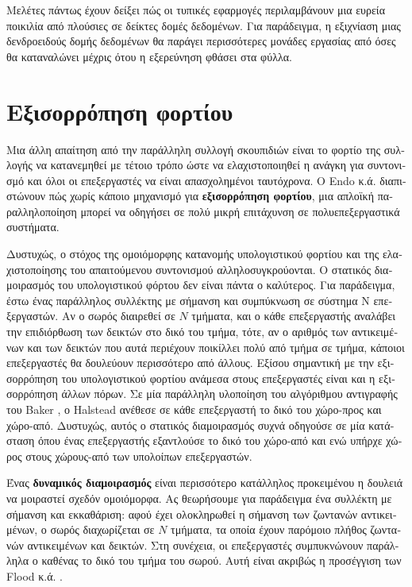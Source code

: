 \begin{greek}
Μελέτες πάντως έχουν δείξει πώς οι τυπικές εφαρμογές περιλαμβάνουν
μια ευρεία ποικιλία από πλούσιες σε δείκτες δομές δεδομένων.
Για παράδειγμα, η εξιχνίαση μιας δενδροειδούς δομής δεδομένων
θα παράγει περισσότερες μονάδες εργασίας από όσες θα καταναλώνει
μέχρις ότου η εξερεύνηση φθάσει στα φύλλα.

\section{Εξισορρόπηση φορτίου}
Μια άλλη απαίτηση από την παράλληλη συλλογή σκουπιδιών είναι
το φορτίο της συλλογής να κατανεμηθεί με τέτοιο τρόπο ώστε να
ελαχιστοποιηθεί η ανάγκη για συντονισμό και όλοι οι επεξεργαστές
να είναι απασχολημένοι ταυτόχρονα. Ο Endo κ.ά. \cite{DBLP:conf/sc/EndoTY97}
διαπιστώνουν πώς χωρίς κάποιο μηχανισμό για \textbf{εξισορρόπηση
φορτίου}, μια απλοϊκή παραλληλοποίηση μπορεί να οδηγήσει σε
πολύ μικρή επιτάχυνση σε πολυεπεξεργαστικά συστήματα.

Δυστυχώς, ο στόχος της ομοιόμορφης κατανομής υπολογιστικού φορτίου
και της ελαχιστοποίησης του απαιτούμενου συντονισμού αλληλοσυγκρούονται.
Ο στατικός διαμοιρασμός του υπολογιστικού φόρτου δεν είναι
πάντα ο καλύτερος. Για παράδειγμα, έστω ένας παράλληλος συλλέκτης
με σήμανση και συμπύκνωση σε σύστημα N επεξεργαστών. Αν ο σωρός
διαιρεθεί σε $N$ τμήματα, και ο κάθε επεξεργαστής αναλάβει την
επιδιόρθωση των δεικτών στο δικό του τμήμα, τότε, αν ο αριθμός
των αντικειμένων και των δεικτών που αυτά περιέχουν ποικίλλει
πολύ από τμήμα σε τμήμα, κάποιοι επεξεργαστές θα δουλεύουν
περισσότερο από άλλους. Εξίσου σημαντική με την εξισορρόπηση
του υπολογιστικού φορτίου ανάμεσα στους επεξεργαστές είναι
και η εξισορρόπηση άλλων πόρων. Σε μία παράλληλη υλοποίηση
του αλγόριθμου αντιγραφής του Baker \cite{DBLP:journals/cacm/Baker78},
ο Halstead \cite{DBLP:conf/lfp/Halstead84, DBLP:journals/toplas/Halstead85}
ανέθεσε σε κάθε επεξεργαστή το δικό του χώρο-προς και χώρο-από.
Δυστυχώς, αυτός ο στατικός διαμοιρασμός συχνά οδηγούσε σε μία
κατάσταση όπου ένας επεξεργαστής εξαντλούσε το δικό του χώρο-από
και ενώ υπήρχε χώρος στους χώρους-από των υπολοίπων επεξεργαστών.

Ένας \textbf{δυναμικός διαμοιρασμός} είναι περισσότερο κατάλληλος
προκειμένου η δουλειά να μοιραστεί σχεδόν ομοιόμορφα. Ας θεωρήσουμε
για παράδειγμα ένα συλλέκτη με σήμανση και εκκαθάριση: αφού έχει
ολοκληρωθεί η σήμανση των ζωντανών αντικειμένων, ο σωρός διαχωρίζεται
σε $Ν$ τμήματα, τα οποία έχουν παρόμοιο πλήθος ζωντανών αντικειμένων
και δεικτών. Στη συνέχεια, οι επεξεργαστές συμπυκνώνουν παράλληλα
ο καθένας το δικό του τμήμα του σωρού. Αυτή είναι ακριβώς η
προσέγγιση των Flood κ.ά. \cite{DBLP:conf/jvm/FloodDSZ01}.


\end{greek}
